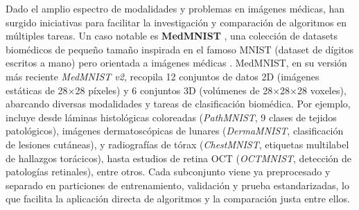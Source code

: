 \documentclass[11pt,spanish,listoffigures,listoftables]{tfgetsinf}
\begin{document}
Dado el amplio espectro de modalidades y problemas en imágenes médicas, han surgido iniciativas para facilitar la investigación 
y comparación de algoritmos en múltiples tareas. Un caso notable es \textbf{MedMNIST} \cite{Yang2022}, una colección de datasets biomédicos de 
pequeño tamaño inspirada en el famoso MNIST (dataset de dígitos escritos a mano) pero orientada a imágenes médicas . MedMNIST, en 
su versión más reciente \textit{MedMNIST v2}, recopila 12 conjuntos de datos 2D (imágenes estáticas de 28$\times$28 píxeles) y 6 
conjuntos 3D (volúmenes de 28$\times$28$\times$28 voxeles), abarcando diversas modalidades y tareas de clasificación biomédica. 
Por ejemplo, incluye desde láminas histológicas coloreadas (\textit{PathMNIST}, 9 clases de tejidos patológicos), imágenes 
dermatoscópicas de lunares (\textit{DermaMNIST}, clasificación de lesiones cutáneas), y radiografías de tórax 
(\textit{ChestMNIST}, etiquetas multilabel de hallazgos torácicos), hasta estudios de retina OCT (\textit{OCTMNIST}, detección 
de patologías retinales), entre otros. Cada subconjunto viene ya preprocesado y separado en particiones de entrenamiento, 
validación y prueba estandarizadas, lo que facilita la aplicación directa de algoritmos y la comparación justa entre ellos.
\end{document}
